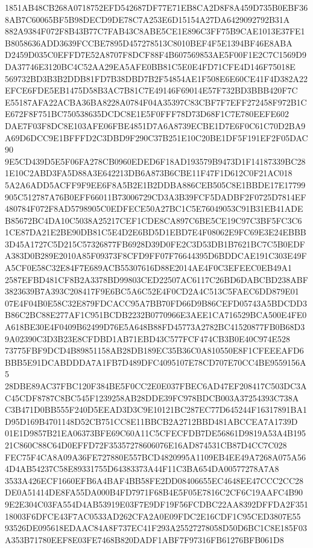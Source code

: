 \documentclass[UTF8,fontset=fandol,zihao=-4,a4paper]{ctexart}
\begin{document}
{{1851AB48CB268A0718752EFD542687DF77E71EB8CA2D8F8A459D735B0EBF368AB7C60065BF5B98DECD9DE78C7A253E6D15154A27DA6429092792B31A
882A9384F072F8B43B77C7FAB43C8ABE5CE1E896C3FF75B9CAE1013E37FE1B8058636ADD3639FCCBE7895D457278513C8010BEF4F5E1394BF46E8ABA
D2459D035C0EFFD7E52A8707F8DCF88F4B607569853AE5F00F1E2C7C1569D9DA37746E3120BC4C52AA29EA5AFE0BB81C5E0E4FD71CFE4D146F75018E
569732BD3B3B2DDB81FD7B38DBD7B2F54854AE1F508E6E60CE41F4D382A22EFCE6FDE5EB1475D58B3AC7B81C7E49146F69014E57F732BD3BBB420F7C
E55187AFA22ACBA36BA8228A0784F04A35397C83CBF7F7EFF272458F972B1CE672F8F751BC750538635DCDC8E1E5F0FFF78D73D68F1C7E780EEFE602
DAE7F03F8DC8E103AFE06FBE4851D7A6A8739ECBE1D7E6F0C61C70D2BA9A69D6DCC9E1BFFFD2C3DBD9F290C37B251E10C20BE1DF5F191EF2F05DAC90
9E5CD439D5E5F06FA278CB0960EDED6F18AD193579B9473D1F14187339BC281E10C2ABD3FA5D88A3E642213DB6A873B6CBE11F47F1D612C0F21AC018
5A2A6ADD5ACFF9F9EE6F8A5B2E1B2DDBA886CEB505C8E1BBDE17E17799905C512787A76B0EFF66011B73006729CD3A3B39FCF5DADBF2F0725D7814EF
480784F072F8AD5798905C0EDFECE50A27BC1C5E76049053C91B31EB41ADEB85672BC4DA10C5038A25217CEF1CDE8CA897C6BE5CE19C97C3BF5FC3C6
1CE87DA21E2BE90DB81C5E4D2E6BD5D1EBD7E4F08062E9FC69E3E24EBBB3D45A1727C5D215C57326877FB6928D39D0FE2C3D53DB1B7621BC7C5B0EDF
A383D0B289E2010A85F09373F8CFD9FF07F76644395D6BDDCAE191C303E49FA5CF0E58C32E84F7E689ACB55307616D88E2014AE4F0C3EFEEC0EB49A1
2587EFBD481CF8B2A3378BD99803CED22507AC6117C26BD6DABCBD238ABF3823639B7A393C208417F9E6BC5A6C52E4F0CD2A4C513C5FAEC6DD879E01
07E4F04B0E58C32E879FDCACC95A7BB70FD66D9B86CEFD05743A5BDCDD3B86C2BC88E277AF1C951BCDB2232B0770966E3AEE1CA716529BCA500E4FE0
A618BE30E4F0409B62499D76E5A648B88FD45773A2782BC41520877FB0B68D39A02390C3D3B23E8CFDBD1AB71EBD43C577FCF474CB3B0E40C974E528
73775FBF9DCD4B89851158AB28DB189EC35B36C0A810550E8F1CFEEEAFD6BBB5E91DCABDDDA7A1FB7D489DFC4095107E78CD707E70CC4BE9559156A5
28DBE89AC37FBC120F384BE5F0CC2E0E037FBEC6AD47EF208417C503DC3AC45CDF8787C8BC545F1239258AB28DDE39FC978BDCB003A37254393C738A
C3B471D0BB555F240D5EEAD3D3C9E10121BC287EC77D645244F16317891BA1D95D169B4701148D52CB751CC8E11BBCB2A2712BBD481ABCCEA7A1739D
01E1D9857B21EA06373BFE69C60A11C5CFECFDB7DE56861D9819A53A4B19521C860C88C64D0EFFD72F35357278606076E16AD874531CB87D4CC7C028
FEC75F4CA8A09A36FE727880E557BCD4820995A1109EB4EE49A7268A075A564D4AB54237C58E89331755D64383373A44F11C3BA654DA00577278A7A8
3533A426ECF1660EFB6A4BAF4BB58FE2DD08406655EC4648EE47CCC2CC28DE0A51414DE8FA55DA000B4FD7971F68B4E5F05E7816C2CF6C19AAFC4B90
9E2E304C03FA554D4AB53919E03F7E9DF19F56FCDBC22AA8392DFFDA2F35118003F6DFCE43F7AC0533AD262CFA2A0E09FDC2E16CDF1C95CED3807E55
93526DE095618EDAAC84A8F737EC41F293A25527278058D50D6BC1C8E185F03A353B71780EEF8E03FE7468B820DADF1ABF7F97316FB61276BFB061D8
}}
\end{document}
